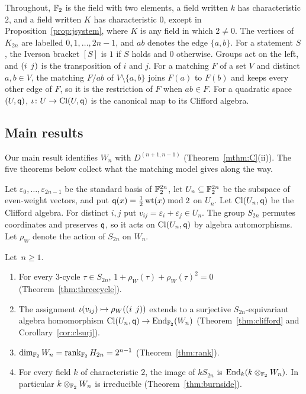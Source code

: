 Throughout, $\mathbb{F}_2$ is the field with two elements, a field written $k$ has characteristic $2$, and a field written $K$ has characteristic $0$, except in Proposition~\ref{prop:jsystem}, where $K$ is any field in which $2\ne0$. The vertices of $K_{2n}$ are labelled $0,1,\dots,2n-1$, and $ab$ denotes the edge $\{a,b\}$. For a statement $S$, the Iverson bracket $[S]$ is $1$ if $S$ holds and $0$ otherwise. Groups act on the left, and $(i\;\,j)$ is the transposition of $i$ and $j$. For a matching $F$ of a set $V$ and distinct $a,b\in V$, the matching $F/ab$ of $V\setminus\{a,b\}$ joins $F(a)$ to $F(b)$ and keeps every other edge of $F$, so it is the restriction of $F$ when $ab\in F$. For a quadratic space $(U,\mathsf{q})$, $\iota\colon U\to\operatorname{Cl}(U,\mathsf{q})$ is the canonical map to its Clifford algebra.

\subsection{Main results}\label{subsec:main}

Our main result identifies $W_n$ with $D^{(n+1,n-1)}$ (Theorem~\ref{mthm:C}(ii)). The five theorems below collect what the matching model gives along the way.

Let $\varepsilon_0,\dots,\varepsilon_{2n-1}$ be the standard basis of $\mathbb{F}_2^{2n}$, let $U_n\subseteq\mathbb{F}_2^{2n}$ be the subspace of even-weight vectors, and put $\mathsf{q}(x)=\tfrac12\operatorname{wt}(x)\bmod2$ on $U_n$. Let $\operatorname{Cl}(U_n,\mathsf{q})$ be the Clifford algebra. For distinct $i,j$ put $v_{ij}=\varepsilon_i+\varepsilon_j\in U_n$. The group $S_{2n}$ permutes coordinates and preserves $\mathsf{q}$, so it acts on $\operatorname{Cl}(U_n,\mathsf{q})$ by algebra automorphisms. Let $\rho_W$ denote the action of $S_{2n}$ on $W_n$.

\begin{mainthm}\label{mthm:A}
Let~${n\ge1}$.
\begin{enumerate}
\item For every $3$-cycle $\tau\in S_{2n}$, $1+\rho_W(\tau)+{\rho_W(\tau)}^2=0$ \textup{(Theorem~\ref{thm:threecycle})}.
\item The assignment $\iota(v_{ij})\mapsto\rho_W((i\;\,j))$ extends to a surjective $S_{2n}$-equivariant algebra homomorphism $\operatorname{Cl}(U_n,\mathsf{q})\to\operatorname{End}_{\mathbb{F}_2}(W_n)$ \textup{(Theorem~\ref{thm:clifford} and Corollary~\ref{cor:clsurj})}.
\item $\dim_{\mathbb{F}_2}W_n=\operatorname{rank}_{\mathbb{F}_2}H_{2n}=2^{n-1}$ \textup{(Theorem~\ref{thm:rank})}.
\item For every field $k$ of characteristic $2$, the image of $kS_{2n}$ is $\operatorname{End}_k(k\otimes_{\mathbb{F}_2}W_n)$. In particular $k\otimes_{\mathbb{F}_2}W_n$ is irreducible \textup{(Theorem~\ref{thm:burnside})}.
\end{enumerate}
\end{mainthm}


